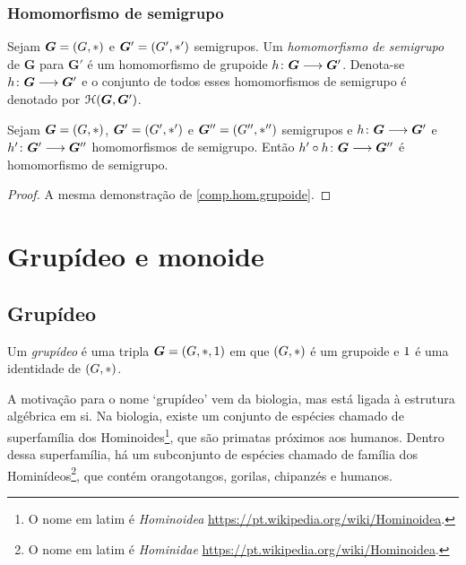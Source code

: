 \subsubsection{Homomorfismo de semigrupo}

\begin{definition}
Sejam $\bm G=(G,\ast)$ e $\bm G'=(G',\ast')$ semigrupos. Um \emph{homomorfismo de semigrupo} de $\bm G$ para $\bm G'$ é um homomorfismo de grupoide ${h}\colon {\bm G} \longrightarrow {\bm G'}$. Denota-se ${h}\colon {\bm G} \longrightarrow {\bm G'}$ e o conjunto de todos esses homomorfismos de semigrupo é denotado por $\mathcal{H}(\bm G,\bm G')$.
\end{definition}

\begin{proposition}
\label{comp.hom.sem}
Sejam $\bm G=(G,\ast)$, $\bm G'=(G',\ast')$ e $\bm G''=(G'',\ast'')$ semigrupos e ${h}\colon {\bm G } \longrightarrow {\bm G'}$ e ${h'}\colon {\bm G'} \longrightarrow {\bm G''}$ homomorfismos de semigrupo. Então ${h' \circ h}\colon {\bm G} \longrightarrow {\bm G''}$ é homomorfismo de semigrupo.
\end{proposition}
\begin{proof}
A mesma demonstração de \ref{comp.hom.grupoide}.
\end{proof}



\section{Grupídeo e monoide}

\subsection{Grupídeo}

\begin{definition}
Um \emph{grupídeo} é uma tripla $\bm G = (G,\ast,1)$ em que $(G,\ast)$ é um grupoide e $1$ é uma identidade de $(G,\ast)$.
\end{definition}

A motivação para o nome `grupídeo' vem da biologia, mas está ligada à estrutura algébrica em si. Na biologia, existe um conjunto de espécies chamado de superfamília dos Hominoides\footnote{O nome em latim é \textit{Hominoidea} \url{https://pt.wikipedia.org/wiki/Hominoidea}.}, que são primatas próximos aos humanos. Dentro dessa superfamília, há um subconjunto de espécies chamado de família dos Hominídeos\footnote{O nome em latim é \textit{Hominidae} \url{https://pt.wikipedia.org/wiki/Hominoidea}.}, que contém orangotangos, gorilas, chipanzés e humanos.

